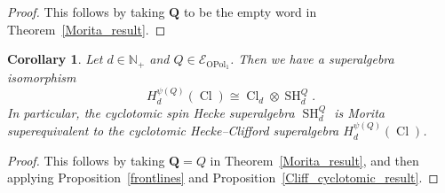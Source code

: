 \documentclass[11pt]{amsart}
\newtheorem{cor}[theo]{Corollary}
\theoremstyle{definition}
\numberwithin{equation}{section}
\begin{document}
\begin{proof}
This follows by taking $ \mathbf{Q} $ to be the empty word in Theorem~\ref{Morita_result}.
\end{proof}

\begin{cor} \label{rooftop}
Let $ d \in \mathbb{N}_{+} $ and $ Q \in \mathcal{E}_{\operatorname{OPol}_{1}} $. Then we have a superalgebra isomorphism
\begin{equation*}
H_{d}^{\psi(Q)}(\operatorname{Cl}) \cong \operatorname{Cl}_{d} \otimes \operatorname{SH}^{Q}_{d}.
\end{equation*}
In particular, the cyclotomic spin Hecke superalgebra $ \operatorname{SH}^{Q}_{d} $ is Morita superequivalent to the cyclotomic Hecke--Clifford superalgebra $ H_{d}^{\psi(Q)}(\operatorname{Cl}) $.
\end{cor}

\begin{proof}
This follows by taking $ \mathbf{Q} = Q $ in Theorem~\ref{Morita_result}, and then applying Proposition~\ref{frontlines} and Proposition~\ref{Cliff_cyclotomic_result}.
\end{proof}













\end{document}
